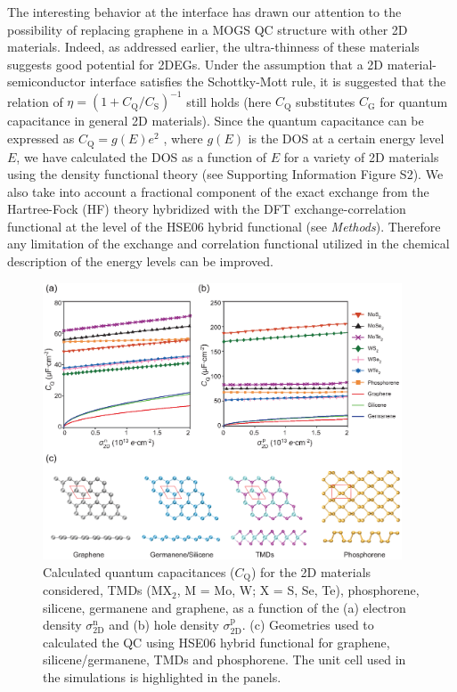 \documentclass[journal=nalefd]{achemso}
\newcommand*\subs[1]{_{\text{#1}}} %
\newcommand*\sups[1]{^{\text{#1}}} %
\newcommand*\change[1]{{#1}}
\begin{document}
The interesting behavior at the interface 
has drawn our attention to the possibility of replacing graphene in a MOGS QC structure with other 2D materials. 
Indeed, as addressed earlier, the ultra-thinness of these materials suggests good potential for 2DEGs.
Under the assumption that a 2D material-semiconductor interface satisfies the Schottky-Mott rule, it is suggested that the relation of  $\eta=(1+C\subs{Q}/C\subs{S})^{-1}$ still holds (here $C\subs{Q}$ substitutes $C\subs{G}$ for quantum capacitance in general 2D materials).  
Since the quantum capacitance can be expressed as $C\subs{Q}=g(E) e^2$ \cite{john2004quantum}, 
where $g(E)$ is the DOS at a certain energy level $E$, 
we have calculated the DOS as a function of $E$ for a variety of 
2D materials\cite{Xu2011Measurements, Jimenez2012drift, Nawaz2016quantum} using the 
density functional theory (see Supporting Information Figure S2). We also take 
into account 
a fractional component of the exact exchange from the Hartree-Fock (HF) theory
hybridized with the DFT exchange-correlation functional at the level of the 
HSE06 hybrid functional\cite{HSE06} (see {\it Methods}). Therefore any limitation of 
the exchange and correlation functional utilized in the chemical description of the energy levels can be improved. 
\begin{figure}[htbp]
  \centering
  \includegraphics[width=0.95\textwidth]{img/FIG5.eps}
  \caption{
  \change{
  Calculated quantum capacitances ($C\subs{Q}$) for the 2D 
  materials considered, TMDs (MX$\subs{2}$, M = Mo, W; X = S, Se, Te), phosphorene, silicene, germanene and graphene,  
  as a function of the (a) electron density $\sigma\subs{2D}\sups{n}$ and (b) hole density $\sigma\subs{2D}\sups{p}$. 
  (c) Geometries used to calculated 
  the QC using HSE06 hybrid functional for graphene, silicene/germanene, TMDs and phosphorene. 
  The unit cell used in the simulations is highlighted in the panels. 
  } 
 }
  \label{fig:CQ-2D}
\end{figure}
\end{document}
